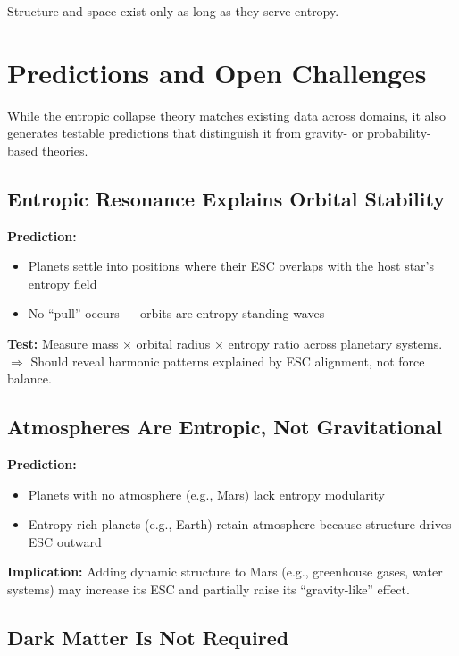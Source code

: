 \documentclass[12pt]{article}
\begin{document}
Structure and space exist only as long as they serve entropy.

\section{Predictions and Open Challenges}

While the entropic collapse theory matches existing data across domains, it also generates testable predictions that distinguish it from gravity- or probability-based theories.

\subsection{Entropic Resonance Explains Orbital Stability}

\textbf{Prediction:}
\begin{itemize}
    \item Planets settle into positions where their ESC overlaps with the host star’s entropy field
    \item No ``pull'' occurs — orbits are entropy standing waves
\end{itemize}

\textbf{Test:} Measure mass × orbital radius × entropy ratio across planetary systems.\\
$\Rightarrow$ Should reveal harmonic patterns explained by ESC alignment, not force balance.

\subsection{Atmospheres Are Entropic, Not Gravitational}

\textbf{Prediction:}
\begin{itemize}
    \item Planets with no atmosphere (e.g., Mars) lack entropy modularity
    \item Entropy-rich planets (e.g., Earth) retain atmosphere because structure drives ESC outward
\end{itemize}

\textbf{Implication:} Adding dynamic structure to Mars (e.g., greenhouse gases, water systems) may increase its ESC and partially raise its ``gravity-like'' effect.

\subsection{Dark Matter Is Not Required}
\end{document}
